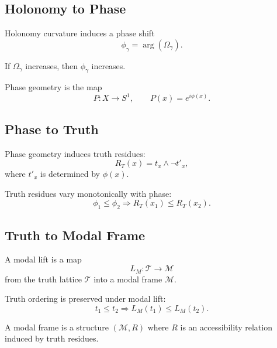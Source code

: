 \subsection{Holonomy to Phase}

\begin{definition}
Holonomy curvature induces a phase shift
\[
\phi_\gamma = \arg(\Omega_\gamma).
\]
\end{definition}

\begin{axiom}
If $\Omega_\gamma$ increases, then $\phi_\gamma$ increases.
\end{axiom}

\begin{definition}
Phase geometry is the map
\[
P : X \to S^1, \qquad P(x) = e^{i\phi(x)}.
\]
\end{definition}

\subsection{Phase to Truth}

\begin{definition}
Phase geometry induces truth residues:
\[
R_T(x) = t_x \wedge \neg t'_x,
\]
where $t'_x$ is determined by $\phi(x)$.
\end{definition}

\begin{axiom}
Truth residues vary monotonically with phase:
\[
\phi_1 \le \phi_2 \Rightarrow R_T(x_1) \le R_T(x_2).
\]
\end{axiom}

\subsection{Truth to Modal Frame}

\begin{definition}
A modal lift is a map
\[
L_M : \mathcal{T} \to \mathcal{M}
\]
from the truth lattice $\mathcal{T}$ into a modal frame $\mathcal{M}$.
\end{definition}

\begin{axiom}
Truth ordering is preserved under modal lift:
\[
t_1 \le t_2 \Rightarrow L_M(t_1) \le L_M(t_2).
\]
\end{axiom}

\begin{definition}
A modal frame is a structure $(\mathcal{M}, R)$ where $R$ is an accessibility
relation induced by truth residues.
\end{definition}
